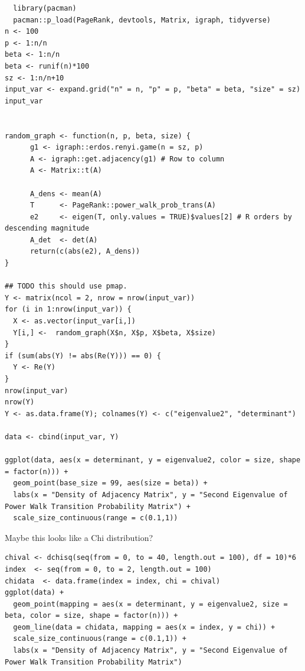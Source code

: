 \documentclass[11pt]{article}
\begin{document}
\begin{verbatim}
  library(pacman)
  pacman::p_load(PageRank, devtools, Matrix, igraph, tidyverse)
n <- 100
p <- 1:n/n
beta <- 1:n/n
beta <- runif(n)*100
sz <- 1:n/n+10
input_var <- expand.grid("n" = n, "p" = p, "beta" = beta, "size" = sz)
input_var


random_graph <- function(n, p, beta, size) {
      g1 <- igraph::erdos.renyi.game(n = sz, p)
      A <- igraph::get.adjacency(g1) # Row to column
      A <- Matrix::t(A)

      A_dens <- mean(A)
      T      <- PageRank::power_walk_prob_trans(A)
      e2     <- eigen(T, only.values = TRUE)$values[2] # R orders by descending magnitude
      A_det  <- det(A)
      return(c(abs(e2), A_dens))
}

## TODO this should use pmap.
Y <- matrix(ncol = 2, nrow = nrow(input_var))
for (i in 1:nrow(input_var)) {
  X <- as.vector(input_var[i,])
  Y[i,] <-  random_graph(X$n, X$p, X$beta, X$size)
}
if (sum(abs(Y) != abs(Re(Y))) == 0) {
  Y <- Re(Y)
}
nrow(input_var)
nrow(Y)
Y <- as.data.frame(Y); colnames(Y) <- c("eigenvalue2", "determinant")

data <- cbind(input_var, Y)

ggplot(data, aes(x = determinant, y = eigenvalue2, color = size, shape = factor(n))) +
  geom_point(base_size = 99, aes(size = beta)) +
  labs(x = "Density of Adjacency Matrix", y = "Second Eigenvalue of Power Walk Transition Probability Matrix") +
  scale_size_continuous(range = c(0.1,1))
\end{verbatim}

Maybe this looks like a Chi distribution?

\begin{verbatim}
chival <- dchisq(seq(from = 0, to = 40, length.out = 100), df = 10)*6
index  <- seq(from = 0, to = 2, length.out = 100)
chidata  <- data.frame(index = index, chi = chival)
ggplot(data) +
  geom_point(mapping = aes(x = determinant, y = eigenvalue2, size = beta, color = size, shape = factor(n))) +
  geom_line(data = chidata, mapping = aes(x = index, y = chi)) +
  scale_size_continuous(range = c(0.1,1)) +
  labs(x = "Density of Adjacency Matrix", y = "Second Eigenvalue of Power Walk Transition Probability Matrix")
\end{verbatim}
\end{document}
